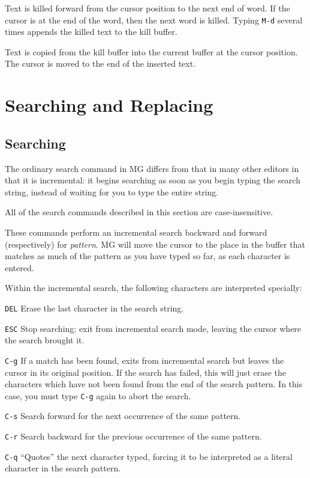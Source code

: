 \fbody Text is killed forward from the cursor position to the next
end of word.  If the cursor is at the end of the word, then the next
word is killed.  Typing {\tt M-d} several times appends the killed
text to the kill buffer.

\fbody Text is copied from the kill buffer into the current buffer at
the cursor position.  The cursor is moved to the end of the inserted
text.

\chapter{Searching and Replacing}

\section{Searching}

The ordinary search command in MG differs from that in many other editors
in that it is incremental:  it begins searching as soon as you begin
typing the search string, instead of waiting for you to type the entire
string.

All of the search commands described in this section are case-insensitive.


\fbody These commands perform an incremental search backward and 
forward (respectively) for {\em pattern\/}.  MG will move the cursor 
to the place in the buffer that matches as much of the pattern as you 
have typed so far, as each character is entered.


Within the incremental search, the following characters are interpreted
specially:

\begin{define}{\hspace{1in}}

\item[{\tt DEL}\hfill] Erase the last character in the search string. 

\item[{\tt ESC}\hfill] Stop searching; exit from incremental search
mode, leaving the cursor where the search brought it. 

\item[{\tt C-g}\hfill] If a match has been found, exits from
incremental search but leaves the cursor in its original position.  If
the search has failed, this will just erase the characters which have
not been found from the end of the search pattern.  In this case, you
must type \verb"C-g" again to abort the search. 

\item[{\tt C-s}\hfill] Search forward for the next occurrence of the
same pattern. 

\item[{\tt C-r}\hfill] Search backward for the previous occurrence of
the same pattern. 

\item[{\tt C-q}\hfill] ``Quotes'' the next character typed, forcing it
to be interpreted as a literal character in the search pattern.
\end{define}


